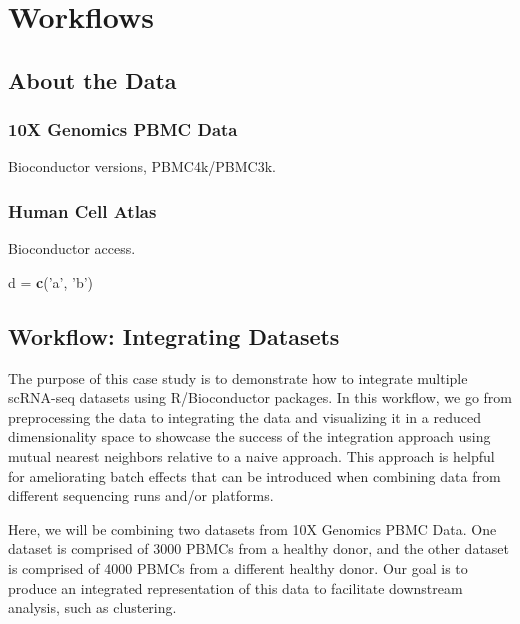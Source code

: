 \documentclass[]{book}
\newenvironment{Shaded}{\begin{snugshade}}{\end{snugshade}}
\newcommand{\KeywordTok}[1]{\textcolor[rgb]{0.13,0.29,0.53}{\textbf{#1}}}
\newcommand{\NormalTok}[1]{#1}
\newcommand{\StringTok}[1]{\textcolor[rgb]{0.31,0.60,0.02}{#1}}
\begin{document}
\hypertarget{part-workflows}{%
\part{Workflows}\label{part-workflows}}

\hypertarget{about-the-data}{%
\chapter{About the Data}\label{about-the-data}}

\hypertarget{x-genomics-pbmc-data}{%
\section{10X Genomics PBMC Data}\label{x-genomics-pbmc-data}}

Bioconductor versions, PBMC4k/PBMC3k.

\hypertarget{human-cell-atlas}{%
\section{Human Cell Atlas}\label{human-cell-atlas}}

Bioconductor access.

\begin{Shaded}
\begin{Highlighting}[]
\NormalTok{d =}\StringTok{ }\KeywordTok{c}\NormalTok{(}\StringTok{'a'}\NormalTok{, }\StringTok{'b'}\NormalTok{)}
\end{Highlighting}
\end{Shaded}

\hypertarget{workflow-integrating-datasets}{%
\chapter{Workflow: Integrating Datasets}\label{workflow-integrating-datasets}}

The purpose of this case study is to demonstrate how to integrate multiple scRNA-seq datasets using R/Bioconductor packages. In this workflow, we go from preprocessing the data to integrating the data and visualizing it in a reduced dimensionality space to showcase the success of the integration approach using mutual nearest neighbors relative to a naive approach. This approach is helpful for ameliorating batch effects that can be introduced when combining data from different sequencing runs and/or platforms.

Here, we will be combining two datasets from 10X Genomics PBMC Data. One dataset is comprised of 3000 PBMCs from a healthy donor, and the other dataset is comprised of 4000 PBMCs from a different healthy donor. Our goal is to produce an integrated representation of this data to facilitate downstream analysis, such as clustering.
\end{document}
